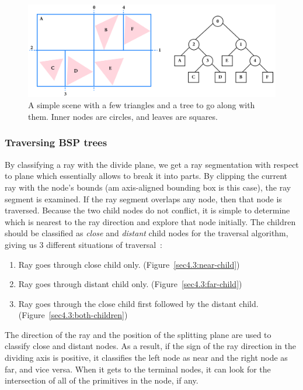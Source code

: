 \documentclass[a4paper,11pt,oneside]{article}
\begin{document}
\begin{figure}[H]
	\begin{center}
		\includegraphics[width=\textwidth]{section4/4.3/bsp-tree-example.png}
	\end{center}
	\caption{A simple scene with a few triangles and a tree to go along with them. Inner nodes are circles, and leaves are squares.}
	\label{sec4.3:example-kd-tree}
\end{figure}

\subsubsection{Traversing BSP trees}

By classifying a ray with the divide plane, we get a ray segmentation with respect to plane which essentially allows to break it into parts. By clipping the current ray with the node's bounds (am axis-aligned bounding box is this case), the ray segment is examined. If the ray segment overlaps any node, then that node is traversed. Because the two child nodes do not conflict, it is simple to determine which is nearest to the ray direction and explore that node initially. The children should be classified as \textit{close} and \textit{distant} child nodes for the traversal algorithm, giving us 3 different situations of traversal~\cite{kd-tree-review}:
\begin{enumerate}
	\item Ray goes through close child only. (Figure~\ref{sec4.3:near-child})
	\item Ray goes through distant child only. (Figure~\ref{sec4.3:far-child})
	\item Ray goes through the close child first followed by the distant child. (Figure~\ref{sec4.3:both-children})
\end{enumerate}

The direction of the ray and the position of the splitting plane are used to classify close and distant nodes. As a result, if the sign of the ray direction in the dividing axis is positive, it classifies the left node as near and the right node as far, and vice versa. When it gets to the terminal nodes, it can look for the intersection of all of the primitives in the node, if any.
\end{document}
